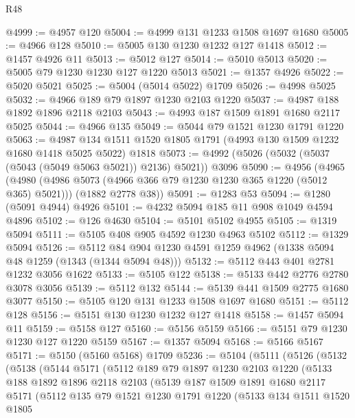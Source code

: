 \begin{lexlean}{R48}
\begin{coremodule}
@4999 := @4957 @120
@5004 := @4999 @131 @1233 @1508 @1697 @1680
@5005 := @4966 @128
@5010 := @5005 @130 @1230 @1232 @127 @1418
@5012 := @1457 @4926 @11
@5013 := @5012 @127
@5014 := @5010 @5013
@5020 := @5005 @79 @1230 @1230 @127 @1220 @5013
@5021 := @1357 @4926
@5022 := @5020 @5021
@5025 := @5004 (@5014 @5022) @1709
@5026 := @4998 @5025
@5032 := @4966 @189 @79 @1897 @1230 @2103 @1220
@5037 := @4987 @188 @1892 @1896 @2118 @2103
@5043 := @4993 @187 @1509 @1891 @1680 @2117 @5025
@5044 := @4966 @135
@5049 := @5044 @79 @1521 @1230 @1791 @1220
@5063 := @4987 @134 @1511 @1520 @1805 @1791 (@4993 @130 @1509 @1232 @1680 @1418 @5025 @5022) @1818
@5073 := @4992 (@5026 (@5032 (@5037 (@5043 (@5049 @5063 @5021)) @2136) @5021)) @3096
@5090 := @4956
    (@4965
      (@4980 (@4986 @5073 (@4966 @366 @79 @1230 @1230 @365 @1220 (@5012 @365) @5021)))
      (@1882 @2778 @38))
@5091 := @1283 @53
@5094 := @1280 (@5091 @4944) @4926
@5101 := @4232 @5094 @185 @11 @908 @1049 @4594 @4896
@5102 := @126 @4630
@5104 := @5101 @5102 @4955
@5105 := @1319 @5094
@5111 := @5105 @408 @905 @4592 @1230 @4963 @5102
@5112 := @1329 @5094
@5126 := @5112 @84 @904 @1230 @4591 @1259 @4962 (@1338 @5094 @48 @1259 (@1343 (@1344 @5094 @48)))
@5132 := @5112 @443 @401 @2781 @1232 @3056 @1622
@5133 := @5105 @122
@5138 := @5133 @442 @2776 @2780 @3078 @3056
@5139 := @5112 @132
@5144 := @5139 @441 @1509 @2775 @1680 @3077
@5150 := @5105 @120 @131 @1233 @1508 @1697 @1680
@5151 := @5112 @128
@5156 := @5151 @130 @1230 @1232 @127 @1418
@5158 := @1457 @5094 @11
@5159 := @5158 @127
@5160 := @5156 @5159
@5166 := @5151 @79 @1230 @1230 @127 @1220 @5159
@5167 := @1357 @5094
@5168 := @5166 @5167
@5171 := @5150 (@5160 @5168) @1709
@5236 := @5104
    (@5111
      (@5126
        (@5132
          (@5138
            (@5144
              @5171
              (@5112
                @189
                @79
                @1897
                @1230
                @2103
                @1220
                (@5133
                  @188
                  @1892
                  @1896
                  @2118
                  @2103
                  (@5139
                    @187
                    @1509
                    @1891
                    @1680
                    @2117
                    @5171
                    (@5112
                      @135
                      @79
                      @1521
                      @1230
                      @1791
                      @1220
                      (@5133
                        @134
                        @1511
                        @1520
                        @1805

\end{coremodule}
\end{lexlean}
